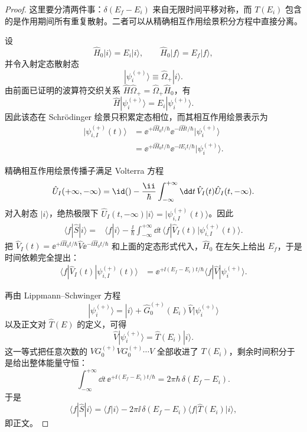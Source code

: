 \begin{proof}
这里要分清两件事：\(\delta(E_f-E_i)\) 来自无限时间平移对称，而 \(T(E_i)\) 包含的是作用期间所有重复散射。二者可以从精确相互作用绘景积分方程中直接分离。

设
\begin{equation*}
\hat H_0|i\rangle=E_i|i\rangle,
\qquad
\hat H_0|f\rangle=E_f|f\rangle,
\end{equation*}
并令入射定态散射态
\begin{equation*}
|\psi_i^{(+)}\rangle
\equiv\hat\Omega_+|i\rangle.
\end{equation*}
由前面已证明的波算符交织关系
\(\hat H\hat\Omega_+=\hat\Omega_+\hat H_0\)，有
\begin{equation*}
\hat H|\psi_i^{(+)}\rangle
=E_i|\psi_i^{(+)}\rangle.
\end{equation*}
因此该态在 Schr\"odinger 绘景只积累定态相位，而其相互作用绘景表示为
\begin{align*}
|\psi_{i,I}^{(+)}(t)\rangle
&=\ee^{+\ii\hat H_0t/\hbar}
\ee^{-\ii\hat Ht/\hbar}|\psi_i^{(+)}\rangle\\
&=\ee^{+\ii\hat H_0t/\hbar}
\ee^{-\ii E_it/\hbar}|\psi_i^{(+)}\rangle.
\end{align*}

精确相互作用绘景传播子满足 Volterra 方程
\begin{equation*}
\hat U_I(+\infty,-\infty)
=\id()-\frac{\ii}{\hbar}
\int_{-\infty}^{+\infty}\dd t\,
\hat V_I(t)\hat U_I(t,-\infty).
\end{equation*}
对入射态 \(|i\rangle\)，绝热极限下
\(\hat U_I(t,-\infty)|i\rangle=|\psi_{i,I}^{(+)}(t)\rangle\)。因此
\begin{align*}
\langle f|\hat S|i\rangle
={}&\langle f|i\rangle
-\frac{\ii}{\hbar}
\int_{-\infty}^{+\infty}\dd t\,
\langle f|\hat V_I(t)|\psi_{i,I}^{(+)}(t)\rangle.
\end{align*}
把
\(\hat V_I(t)=\ee^{+\ii\hat H_0t/\hbar}\hat V\ee^{-\ii\hat H_0t/\hbar}\)
和上面的定态形式代入，\(\hat H_0\) 在左矢上给出 \(E_f\)，于是时间依赖完全提出：
\begin{align*}
\langle f|\hat V_I(t)|\psi_{i,I}^{(+)}(t)\rangle
&=\ee^{+\ii(E_f-E_i)t/\hbar}
\langle f|\hat V|\psi_i^{(+)}\rangle.
\end{align*}

再由 Lippmann--Schwinger 方程
\begin{equation*}
|\psi_i^{(+)}\rangle
=|i\rangle+\hat G_0^{(+)}(E_i)\hat V|\psi_i^{(+)}\rangle
\end{equation*}
以及正文对 \(\hat T(E)\) 的定义，可得
\begin{equation*}
\hat V|\psi_i^{(+)}\rangle
=\hat T(E_i)|i\rangle.
\end{equation*}
这一等式把任意次数的
\(V G_0^{(+)}V G_0^{(+)}\cdots V\)
全部收进了 \(T(E_i)\)，剩余时间积分于是给出整体能量守恒：
\begin{equation*}
\int_{-\infty}^{+\infty}\dd t\,
\ee^{+\ii(E_f-E_i)t/\hbar}
=2\pi\hbar\,\delta(E_f-E_i).
\end{equation*}
于是
\begin{equation*}
\langle f|\hat S|i\rangle
=\langle f|i\rangle
-2\pi\ii\,\delta(E_f-E_i)
\langle f|\hat T(E_i)|i\rangle,
\end{equation*}
即正文。


\end{proof}

